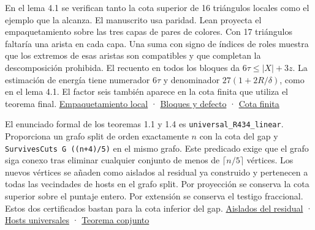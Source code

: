 \documentclass[spanish,11pt,a4paper]{article}
\begin{document}
En el lema 4.1 se verifican tanto la cota superior de 16 triángulos locales como el ejemplo que la alcanza. El manuscrito usa paridad. Lean proyecta el empaquetamiento sobre las tres capas de pares de colores. Con 17 triángulos faltaría una arista en cada capa. Una suma con signo de índices de roles muestra que los extremos de esas aristas son compatibles y que completan la descomposición prohibida. El recuento en todos los bloques da \(6\tau\le |X|+3z\). La estimación de energía tiene numerador \(6\tau\) y denominador \(27(1+2R/\delta)\), como en el lema 4.1. El factor seis también aparece en la cota finita que utiliza el teorema final. \href{https://github.com/jtraverso/split-clique-partition-gap/blob/ccb5444b2ecdff9de1d6221133633a25a224953d/R434/LocalPacking.lean}{Empaquetamiento local} · \href{https://github.com/jtraverso/split-clique-partition-gap/blob/ccb5444b2ecdff9de1d6221133633a25a224953d/R434/CoreDefect.lean}{Bloques y defecto} · \href{https://github.com/jtraverso/split-clique-partition-gap/blob/ccb5444b2ecdff9de1d6221133633a25a224953d/R434/FiniteR434.lean}{Cota finita}

El enunciado formal de los teoremas 1.1 y 1.4 es \texttt{universal\_R434\_linear}. Proporciona un grafo split de orden exactamente \(n\) con la cota del gap y \texttt{SurvivesCuts\ G\ ((n+4)/5)} en el mismo grafo. Este predicado exige que el grafo siga conexo tras eliminar cualquier conjunto de menos de \(\lceil n/5\rceil\) vértices. Los nuevos vértices se añaden como aislados al residual ya construido y pertenecen a todas las vecindades de hosts en el grafo split. Por proyección se conserva la cota superior sobre el puntaje entero. Por extensión se conserva el testigo fraccional. Estos dos certificados bastan para la cota inferior del gap. \href{https://github.com/jtraverso/split-clique-partition-gap/blob/ccb5444b2ecdff9de1d6221133633a25a224953d/R434/ResidualIsolates.lean}{Aislados del residual} · \href{https://github.com/jtraverso/split-clique-partition-gap/blob/ccb5444b2ecdff9de1d6221133633a25a224953d/R434/UniversalHosts.lean}{Hosts universales} · \href{https://github.com/jtraverso/split-clique-partition-gap/blob/ccb5444b2ecdff9de1d6221133633a25a224953d/R434/PolylogGap.lean}{Teorema conjunto}
\end{document}
